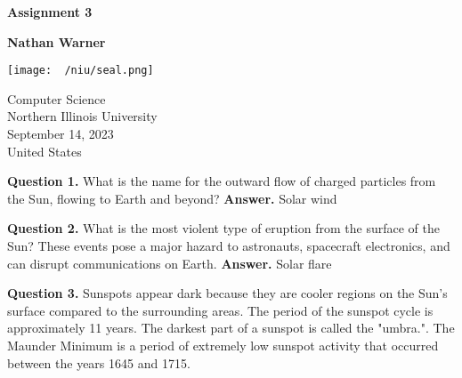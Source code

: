 \documentclass{report}
\title{\Huge{}}
\author{\huge{Nathan Warner}}
\date{\huge{}}
\begin{document}
        \begin{titlepage}
       \begin{center}
           \vspace*{1cm}
    
           \textbf{Assignment 3}
    
           \vspace{0.5cm}
            
                
           \vspace{1.5cm}
    
           \textbf{Nathan Warner}
    
           \vfill
                
                
           \vspace{0.8cm}
         
           \texttt{[image: ~/niu/seal.png]}
                
           Computer Science \\
           Northern Illinois University\\
           September 14, 2023 \\
           United States\\
           
                
       \end{center}
    \end{titlepage}
    \tableofcontents
    \pagebreak \bigbreak \noindent
    \textbf{Question 1.} What is the name for the outward flow of charged particles from the Sun, flowing to Earth and beyond?
    \bigbreak \noindent 
    \textbf{Answer.} Solar wind

    \bigbreak \noindent 
    \textbf{Question 2.} What is the most violent type of eruption from the surface of the Sun? These events pose a major hazard to astronauts, spacecraft electronics, and can disrupt communications on Earth.
    \bigbreak \noindent 
    \textbf{Answer.} Solar flare

    \bigbreak \noindent 
    \textbf{Question 3.} Sunspots appear dark because they are cooler regions on the Sun's surface compared to the surrounding areas. The period of the sunspot cycle is approximately 11 years. The darkest part of a sunspot is called the "umbra.". The Maunder Minimum is a period of extremely low sunspot activity that occurred between the years 1645 and 1715.
\end{document}

